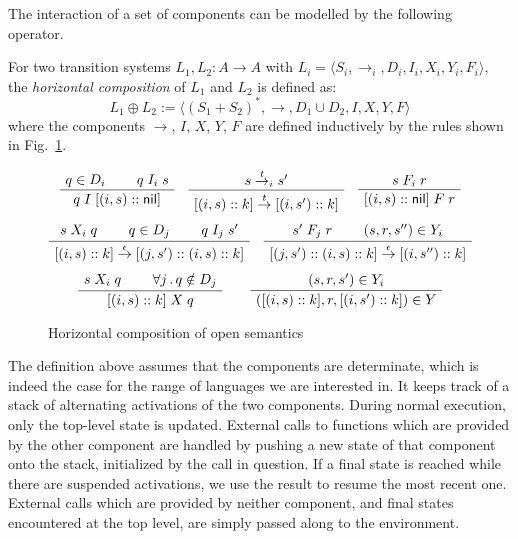 \documentclass[sigplan,10pt,review,anonymous]{acmart}
\newcommand{\kw}[1]{\ensuremath{ \mathsf{#1} }}
\begin{document}
The interaction of a set of components
can be modelled by the following operator.

\begin{definition} \label{def:hcomp} %
For two transition systems $L_1, L_2 : A \rightarrow A$
with
$L_i = \langle S_i, {\rightarrow}_i, D_i, I_i, X_i, Y_i, F_i \rangle$,
the \emph{horizontal composition} of $L_1$ and $L_2$
is defined as:
\[
    L_1 \oplus L_2 :=
    \langle
      (S_1 + S_2)^*, {\rightarrow}, D_1 \cup D_2, I, X, Y, F
    \rangle
\]
where the components $\rightarrow$, $I$, $X$, $Y$, $F$
are defined inductively by
the rules shown in Fig.~\ref{fig:hcomp}.
\end{definition}

\begin{figure} %
    \footnotesize
    \begin{gather*}
        \AxiomC{$q \in D_i$}
        \AxiomC{$q \mathrel{I_i} s$}
        \BinaryInfC{$q \mathrel{I} [(i, s) :: \kw{nil}]$}
        \DisplayProof
        \quad
        \AxiomC{$s \stackrel{t}{\rightarrow}_i s'$}
        \UnaryInfC{$
            [(i, s) :: k]
            \stackrel{t}{\rightarrow}
            [(i, s') :: k]$}
        \DisplayProof
        \quad
        \AxiomC{$s \mathrel{F_i} r$}
        \UnaryInfC{$[(i, s) :: \kw{nil}] \mathrel{F} r$}
        \DisplayProof
        \\[1ex]
        \AxiomC{$s \mathrel{X_i} q$}
        \AxiomC{$q \in D_j$}
        \AxiomC{$q \mathrel{I_j} s'$}
        \TrinaryInfC{$
            [(i, s) :: k]
            \stackrel{\epsilon}{\rightarrow}
            [(j, s') :: (i, s) :: k]$}
        \DisplayProof
        \quad
        \AxiomC{$s' \mathrel{F_j} r$}
        \AxiomC{$(s, r, s'') \in Y_i$}
        \BinaryInfC{$
            [(j, s') :: (i, s) :: k]
            \stackrel{\epsilon}{\rightarrow}
            [(i, s'') :: k]$}
        \DisplayProof
        \\[1ex]
        \AxiomC{$s \mathrel{X_i} q$}
        \AxiomC{$\forall j \,.\, q \notin D_j$}
        \BinaryInfC{$[(i, s) :: k] \mathrel{X} q$}
        \DisplayProof
        \qquad
        \AxiomC{$(s, r, s') \in Y_i$}
        \UnaryInfC{$([(i, s) :: k], r, [(i, s') :: k]) \in Y$}
        \DisplayProof
    \end{gather*}
    \caption{Horizontal composition of open semantics}
    \label{fig:hcomp}
\end{figure}

The definition above
assumes that the components are determinate,
which is indeed the case for the range of languages
we are interested in.
It keeps track of a stack of alternating activations
of the two components.
During normal execution,
only the top-level state is updated.
External calls to functions which are provided by the other component
are handled by pushing a new state of that component onto the stack,
initialized by the call in question.
If a final state is reached
while there are suspended activations,
we use the result to resume the most recent one.
External calls which are provided by neither component,
and final states encountered at the top level,
are simply passed along to the environment.
\end{document}
